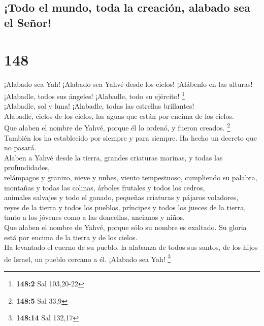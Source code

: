 \hypertarget{todo-el-mundo-toda-la-creaciuxf3n-alabado-sea-el-seuxf1or}{%
\subsection{¡Todo el mundo, toda la creación, alabado sea el
Señor!}\label{todo-el-mundo-toda-la-creaciuxf3n-alabado-sea-el-seuxf1or}}

\hypertarget{section-145}{%
\section{148}\label{section-145}}

 ¡Alabado sea Yah! ¡Alabado sea Yahvé desde los cielos!
¡Alábenlo en las alturas!\\
 ¡Alabadle, todos sus ángeles! ¡Alabadle, todo su
ejército! \footnote{\textbf{148:2} Sal 103,20-22}\\
 ¡Alabadle, sol y luna! ¡Alabadle, todas las estrellas
brillantes!\\
 Alabadle, cielos de los cielos, las aguas que están por
encima de los cielos.\\
 Que alaben el nombre de Yahvé, porque él lo ordenó, y
fueron creados. \footnote{\textbf{148:5} Sal 33,9}\\
 También los ha establecido por siempre y para siempre. Ha
hecho un decreto que no pasará.\\
 Alaben a Yahvé desde la tierra, grandes criaturas
marinas, y todas las profundidades,\\
 relámpagos y granizo, nieve y nubes, viento tempestuoso,
cumpliendo su palabra,\\
 montañas y todas las colinas, árboles frutales y todos
los cedros,\\
 animales salvajes y todo el ganado, pequeñas criaturas y
pájaros voladores,\\
 reyes de la tierra y todos los pueblos, príncipes y
todos los jueces de la tierra,\\
 tanto a los jóvenes como a las doncellas, ancianos y
niños.\\
 Que alaben el nombre de Yahvé, porque sólo su nombre es
exaltado. Su gloria está por encima de la tierra y de los cielos.\\
 Ha levantado el cuerno de su pueblo, la alabanza de
todos sus santos, de los hijos de Israel, un pueblo cercano a él.
¡Alabado sea Yah! \footnote{\textbf{148:14} Sal 132,17}

